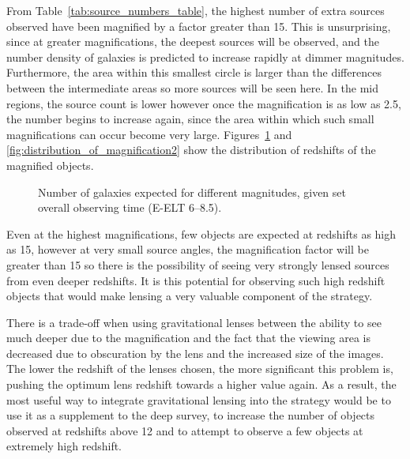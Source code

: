 	From Table~\ref{tab:source_numbers_table}, the highest number of extra sources observed have been magnified by a factor greater than 15. This is unsurprising, since at greater magnifications, the deepest sources will be observed, and the number density of galaxies is predicted to increase rapidly at dimmer magnitudes. Furthermore, the area within this smallest circle is larger than the differences between the intermediate areas so more sources will be seen here. In the mid regions, the source count is lower however once the magnification is as low as 2.5, the number begins to increase again, since the area within which such small magnifications can occur become very large. Figures~\ref{fig:distribution_of_magnification1} and \ref{fig:distribution_of_magnification2} show the distribution of redshifts of the magnified objects.
	\begin{figure}[!htbp]
    	\begin{minipage}[c]{0.5\linewidth}
			\centering
				\begingroup{}
					\resizebox{\textwidth}{!}{%
						
					}\endgroup
		\end{minipage}
    	\begin{minipage}[c]{0.5\linewidth}
			\centering
				\begingroup{}
					\resizebox{\textwidth}{!}{%
						
					}\endgroup
		\end{minipage}
		\caption{Number of galaxies expected for different magnitudes, given set overall observing time (E-ELT 6--8.5).\label{fig:distribution_of_magnification1}}
	\end{figure}

	Even at the highest magnifications, few objects are expected at redshifts as high as 15, however at very small source angles, the magnification factor will be greater than 15 so there is the possibility of seeing very strongly lensed sources from even deeper redshifts. It is this potential for observing such high redshift objects that would make lensing a very valuable component of the strategy.

	There is a trade-off when using gravitational lenses between the ability to see much deeper due to the magnification and the fact that the viewing area is decreased due to obscuration by the lens and the increased size of the images. The lower the redshift of the lenses chosen, the more significant this problem is, pushing the optimum lens redshift towards a higher value again. As a result, the most useful way to integrate gravitational lensing into the strategy would be to use it as a supplement to the deep survey, to increase the number of objects observed at redshifts above 12 and to attempt to observe a few objects at extremely high redshift.

